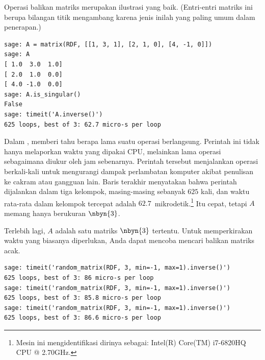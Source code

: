 Operasi balikan matriks merupakan ilustrasi yang baik.
(Entri-entri matriks ini berupa bilangan titik mengambang
karena jenis inilah yang paling umum dalam penerapan.)
\begin{lstlisting}
sage: A = matrix(RDF, [[1, 3, 1], [2, 1, 0], [4, -1, 0]])
sage: A
[ 1.0  3.0  1.0]
[ 2.0  1.0  0.0]
[ 4.0 -1.0  0.0]
sage: A.is_singular()
False
sage: timeit('A.inverse()')
625 loops, best of 3: 62.7 micro-s per loop
\end{lstlisting}
Dalam \Sage,  memberi tahu berapa lama
suatu operasi berlangsung.
Perintah ini tidak hanya melaporkan waktu yang dipakai CPU,
melainkan lama operasi sebagaimana diukur oleh jam sebenarnya.
Perintah tersebut menjalankan operasi berkali-kali untuk mengurangi
dampak perlambatan komputer akibat penulisan ke cakram atau gangguan lain.
Baris terakhir menyatakan bahwa perintah dijalankan dalam tiga kelompok,
masing-masing sebanyak $625$ kali, dan waktu rata-rata dalam kelompok
tercepat adalah $62.7$~mikrodetik.\footnote{%
  Mesin ini mengidentifikasi dirinya sebagai:
  Intel(R) Core(TM) i7-6820HQ CPU @ 2.70GHz.}
Itu cepat, tetapi $A$ memang hanya berukuran $\nbyn{3}$.

Terlebih lagi, $A$ adalah satu matriks $\nbyn{3}$ tertentu.
Untuk memperkirakan waktu yang biasanya diperlukan,
Anda dapat mencoba mencari balikan matriks acak.
\begin{lstlisting}
sage: timeit('random_matrix(RDF, 3, min=-1, max=1).inverse()')
625 loops, best of 3: 86 micro-s per loop
sage: timeit('random_matrix(RDF, 3, min=-1, max=1).inverse()')
625 loops, best of 3: 85.8 micro-s per loop
sage: timeit('random_matrix(RDF, 3, min=-1, max=1).inverse()')
625 loops, best of 3: 86.6 micro-s per loop
\end{lstlisting}

